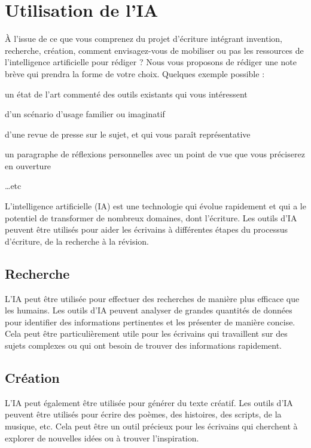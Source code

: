 \documentclass{./StyCls/MyArticle}
\begin{document}
\section{Utilisation de l'IA}

À l’issue de ce que vous comprenez du projet d’écriture intégrant invention, recherche, création, comment envisagez-vous de mobiliser ou pas les ressources de l’intelligence artificielle pour rédiger ? Nous vous proposons de rédiger une note brève qui prendra la forme de votre choix. Quelques exemple possible :
\item  un état de l’art commenté des outils existants qui vous intéressent
\item  d’un scénario d’usage familier ou imaginatif
\item d’une revue de presse sur le sujet, et qui vous paraît représentative
\item  un paragraphe de réflexions personnelles avec un point de vue que vous préciserez
en ouverture
\item  \ldots etc

L'intelligence artificielle (IA) est une technologie qui évolue rapidement et qui a le potentiel de transformer de nombreux domaines, dont l'écriture. Les outils d'IA peuvent être utilisés pour aider les écrivains à différentes étapes du processus d'écriture, de la recherche à la révision.

\subsection{Recherche}

L'IA peut être utilisée pour effectuer des recherches de manière plus efficace que les humains. Les outils d'IA peuvent analyser de grandes quantités de données pour identifier des informations pertinentes et les présenter de manière concise. Cela peut être particulièrement utile pour les écrivains qui travaillent sur des sujets complexes ou qui ont besoin de trouver des informations rapidement.

\subsection{Création}

L'IA peut également être utilisée pour générer du texte créatif. Les outils d'IA peuvent être utilisés pour écrire des poèmes, des histoires, des scripts, de la musique, etc. Cela peut être un outil précieux pour les écrivains qui cherchent à explorer de nouvelles idées ou à trouver l'inspiration.
\end{document}
